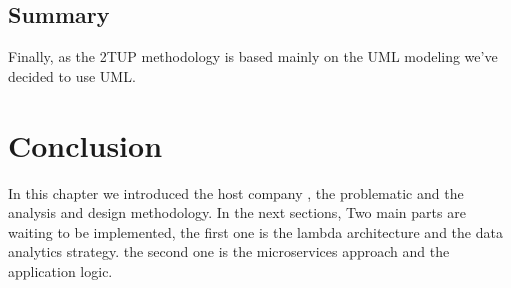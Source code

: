 \subsection{Summary}
\label{subsec:subsec01}
Finally, as the 2TUP methodology is based mainly on the UML modeling we've decided to use UML.
\section{ Conclusion }
\label{subsec:subsec01}
In this chapter we introduced the host company , the problematic and the analysis and design methodology.
In the next sections, Two main parts are waiting to be implemented, the first one is the lambda architecture and the data analytics strategy. the second one is the microservices approach and the application logic.

